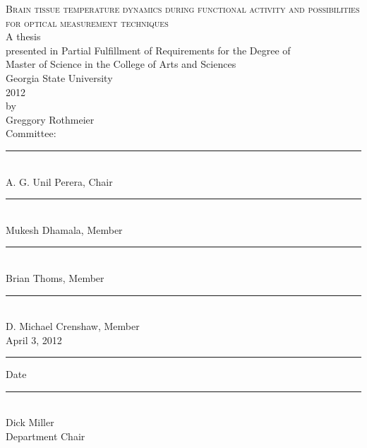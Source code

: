 \documentclass[11pt]{report}
\newcommand{\signhere}{\vspace{0.3in}\rule{\linewidth}{0.5mm}\\}
\begin{document}
\centering
  \textsc{Brain tissue temperature dynamics during functional activity and possibilities for optical measurement techniques}\\
  \vspace{0.1in}
  A thesis\\
  presented in Partial Fulfillment of Requirements for the Degree of \\ Master of Science in the College of Arts and Sciences \\
  Georgia State University\\
  2012\\
  by\\
  Greggory Rothmeier\\
  \vspace*{\fill}
  Committee:\\
  \begin{singlespace}
    \signhere
    A. G. Unil Perera, Chair\\
    \signhere
    Mukesh Dhamala, Member\\
    \signhere
    Brian Thoms, Member\\
    \signhere
    D. Michael Crenshaw, Member \\
    \vspace{0.1in}
    April 3, 2012\\
    \rule{\linewidth}{0.5mm}
    Date\\
    \signhere
    Dick Miller\\
    Department Chair\\
  \end{singlespace}
\end{document}
